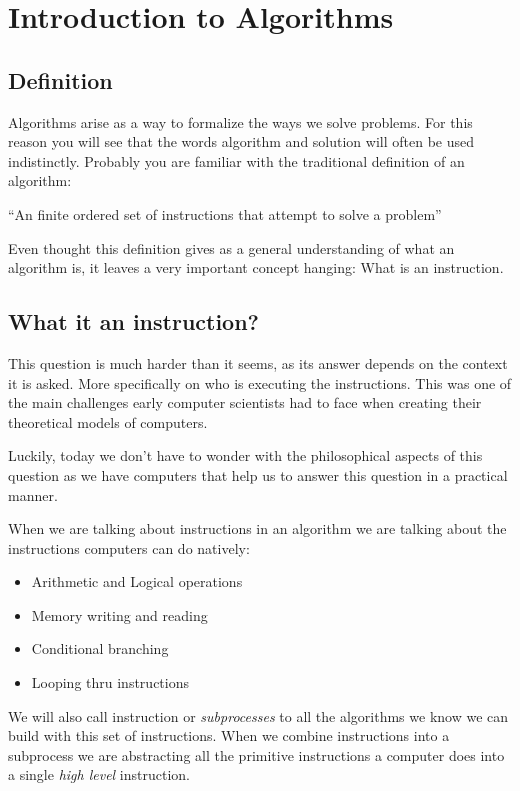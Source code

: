 \documentclass{article}
\begin{document}
\section{Introduction to Algorithms}

\subsection{Definition}

Algorithms arise as a way to formalize the ways we solve problems. For this reason you will see that the words algorithm and solution will often be used indistinctly. Probably you are familiar with the traditional definition of an algorithm: 
\begin{center}
	``An finite ordered set of instructions that attempt to solve a problem''
\end{center}

Even thought this definition gives as a general understanding of what an algorithm is, it leaves a very important concept hanging: What is an instruction. 

\subsection{What it an instruction?}

This question is much harder than it seems, as its answer depends on the context it is asked. More specifically on who is executing the instructions. This was one of the main challenges early computer scientists had to face when creating their theoretical models of computers.

Luckily, today we don't have to wonder with the philosophical aspects of this question as we have computers that help us to answer this question in a practical manner.

When we are talking about instructions in an algorithm we are talking about the instructions computers can do natively:

\begin{itemize}
	\item Arithmetic and Logical operations
	\item Memory writing and reading
	\item Conditional branching
	\item Looping thru instructions
\end{itemize}

We will also call instruction or \textit{subprocesses} to all the algorithms we know we can build with this set of instructions. When we combine instructions into a subprocess we are abstracting all the primitive instructions a computer does into a single \textit{high level} instruction.
\end{document}
